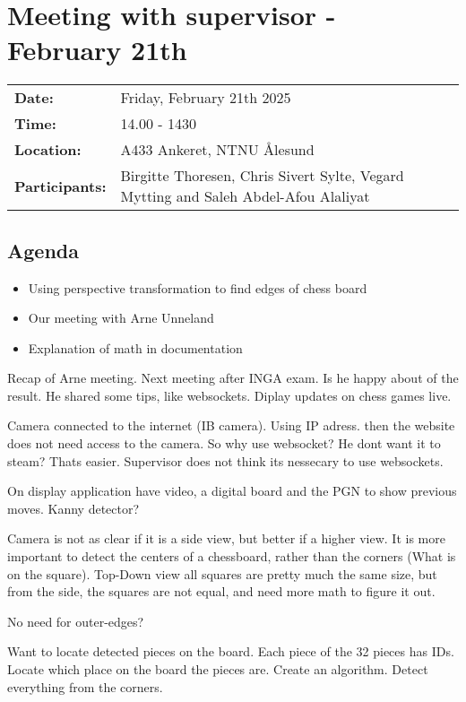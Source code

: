 \section{Meeting with supervisor - February 21th}
\begin{tabular}{ll}
    \textbf{Date:} & Friday, February 21th 2025 \\
    \textbf{Time:} & 14.00 - 1430\\
    \textbf{Location:} & A433 Ankeret, NTNU Ålesund \\
    \textbf{Participants:} & Birgitte Thoresen, Chris Sivert Sylte, Vegard Mytting and Saleh Abdel-Afou Alaliyat\\
\end{tabular}

\vspace{0.5cm}

\subsection{Agenda}

\begin{itemize}
    \item Using perspective transformation to find edges of chess board
    \item Our meeting with Arne Unneland
    \item Explanation of math in documentation
\end{itemize}

Recap of Arne meeting. Next meeting after INGA exam. Is he happy about of the result. He shared some tips, like websockets. Diplay updates on chess games live. 

Camera connected to the internet (IB camera). Using IP adress. then the website does not need access to the camera. So why use websocket? He dont want it to steam? Thats easier. Supervisor does not think its nessecary to use websockets. 

On display application have video, a digital board and the PGN to show previous moves. Kanny detector?

Camera is not as clear if it is a side view, but better if a higher view. It is more important to detect the centers of a chessboard, rather than the corners (What is on the square). Top-Down view all squares are pretty much the same size, but from the side, the squares are not equal, and need more math to figure it out.

No need for outer-edges? 

Want to locate detected pieces on the board. Each piece of the 32 pieces has IDs. Locate which place on the board the pieces are. Create an algorithm. Detect everything from the corners. 

